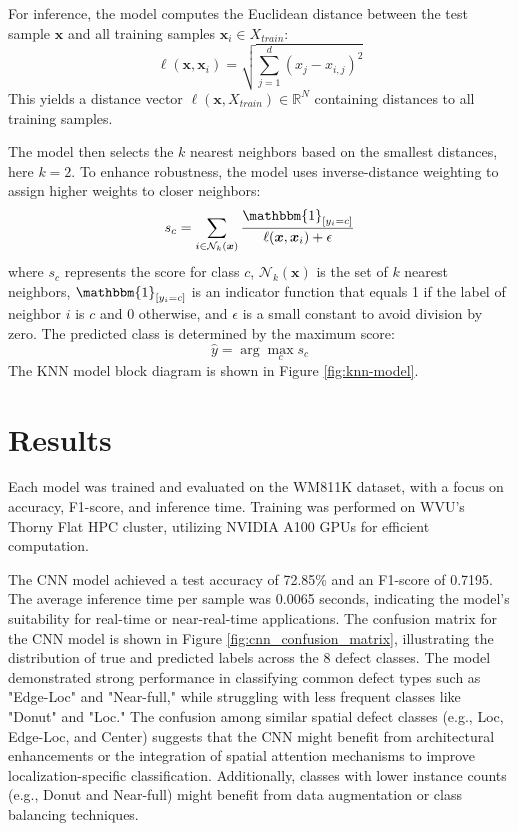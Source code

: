 \documentclass[conference]{IEEEtran}
\begin{document}
For inference, the model computes the Euclidean distance between the test sample \( \bm{x} \) and all training samples \( \bm{x}_i \in X_{train} \):
\begin{equation}
    \ell(\bm{x}, \bm{x}_i) = \sqrt{\sum_{j=1}^{d} (x_j - x_{i,j})^2}
\end{equation}
This yields a distance vector \( \ell(\bm{x}, X_{train}) \in \mathbb{R}^{N} \) containing distances to all training samples.

The model then selects the \(k\) nearest neighbors based on the smallest distances, here \(k=2\).
To enhance robustness, the model uses inverse-distance weighting to assign higher weights to closer neighbors:
\begin{equation}
    s_c = \sum_{i\in \mathcal{N}_k(\bm{x})} \frac{\mathbbm{1}_{[y_i=c]}}{\ell(\bm{x}, \bm{x}_i) + \epsilon}
\end{equation}
where \( s_c \) represents the score for class \(c\), \(\mathcal{N}_k(\bm{x})\) is the set of \(k\) nearest neighbors, 
$\mathbbm{1}_{[y_i=c]}$ is an indicator function that equals 1 if the label of neighbor \(i\) is \(c\) and 0 otherwise,
and \(\epsilon\) is a small constant to avoid division by zero.
The predicted class is determined by the maximum score:
\begin{equation}
    \hat{y} = \arg\max_{c} s_c
\end{equation}
The KNN model block diagram is shown in Figure \ref{fig:knn-model}.

\section{Results} 
Each model was trained and evaluated on the WM811K dataset, with a focus on accuracy, F1-score, and inference time.
Training was performed on WVU's Thorny Flat HPC cluster, utilizing NVIDIA A100 GPUs for efficient computation.

The CNN model achieved a test accuracy of 72.85\% and an F1-score of 0.7195. The average inference time per sample was 0.0065 seconds, indicating the model's suitability for real-time or near-real-time applications.
The confusion matrix for the CNN model is shown in Figure \ref{fig:cnn_confusion_matrix}, illustrating the distribution of true and predicted labels across the 8 defect classes.
The model demonstrated strong performance in classifying common defect types such as "Edge-Loc" and "Near-full," while struggling with less frequent classes like "Donut" and "Loc."
The confusion among similar spatial defect classes (e.g., Loc, Edge-Loc, and Center) suggests that the CNN might benefit from architectural enhancements or the integration of spatial attention mechanisms to improve localization-specific classification. 
Additionally, classes with lower instance counts (e.g., Donut and Near-full) might benefit from data augmentation or class balancing techniques.
\end{document}
